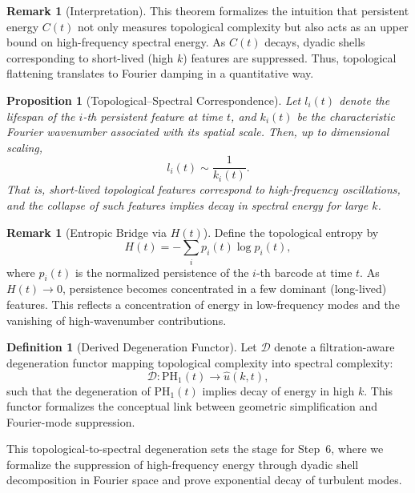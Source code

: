 \documentclass[11pt]{article}
\newtheorem{proposition}[theorem]{Proposition}
\theoremstyle{definition}
\newtheorem{definition}[theorem]{Definition}
\newtheorem{remark}[theorem]{Remark}
\begin{document}
\begin{remark}[Interpretation]
This theorem formalizes the intuition that persistent energy $C(t)$ not only measures topological complexity but also acts as an upper bound on high-frequency spectral energy. As $C(t)$ decays, dyadic shells corresponding to short-lived (high $k$) features are suppressed. Thus, topological flattening translates to Fourier damping in a quantitative way.
\end{remark}

\begin{proposition}[Topological--Spectral Correspondence]
Let $l_i(t)$ denote the lifespan of the $i$-th persistent feature at time $t$, and $k_i(t)$ be the characteristic Fourier wavenumber associated with its spatial scale. Then, up to dimensional scaling,
\[
l_i(t) \sim \frac{1}{k_i(t)}.
\]
That is, short-lived topological features correspond to high-frequency oscillations, and the collapse of such features implies decay in spectral energy for large $k$.
\end{proposition}

\begin{remark}[Entropic Bridge via $H(t)$]
Define the topological entropy by
\[
H(t) = -\sum_i p_i(t) \log p_i(t),
\]
where $p_i(t)$ is the normalized persistence of the $i$-th barcode at time $t$. As $H(t) \to 0$, persistence becomes concentrated in a few dominant (long-lived) features. This reflects a concentration of energy in low-frequency modes and the vanishing of high-wavenumber contributions.
\end{remark}

\begin{definition}[Derived Degeneration Functor]
Let $\mathcal{D}$ denote a filtration-aware degeneration functor mapping topological complexity into spectral complexity:
\[
\mathcal{D} : \mathrm{PH}_1(t) \longrightarrow \widehat{u}(k, t),
\]
such that the degeneration of $\mathrm{PH}_1(t)$ implies decay of energy in high $k$. This functor formalizes the conceptual link between geometric simplification and Fourier-mode suppression.
\end{definition}

This topological-to-spectral degeneration sets the stage for Step~6, where we formalize the suppression of high-frequency energy through dyadic shell decomposition in Fourier space and prove exponential decay of turbulent modes.



\end{document}
